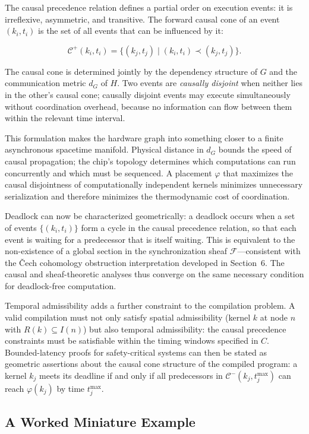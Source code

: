 \documentclass[11pt, a4paper]{article}
\begin{document}
The causal precedence relation defines a partial order on execution events: it is
irreflexive, asymmetric, and transitive. The forward causal cone of an event
$(k_i, t_i)$ is the set of all events that can be influenced by it:

\[
\mathcal{C}^+(k_i, t_i) = \{(k_j, t_j) \mid (k_i, t_i) \prec (k_j, t_j)\}.
\]

The causal cone is determined jointly by the dependency structure of $G$ and the
communication metric $d_G$ of $H$. Two events are \emph{causally disjoint} when
neither lies in the other's causal cone; causally disjoint events may execute
simultaneously without coordination overhead, because no information can flow
between them within the relevant time interval.

This formulation makes the hardware graph into something closer to a finite
asynchronous spacetime manifold. Physical distance in $d_G$ bounds the speed of
causal propagation; the chip's topology determines which computations can run
concurrently and which must be sequenced. A placement $\varphi$ that maximizes the
causal disjointness of computationally independent kernels minimizes unnecessary
serialization and therefore minimizes the thermodynamic cost of coordination.

Deadlock can now be characterized geometrically: a deadlock occurs when a set of
events $\{(k_i, t_i)\}$ form a cycle in the causal precedence relation, so that
each event is waiting for a predecessor that is itself waiting. This is equivalent
to the non-existence of a global section in the synchronization sheaf
$\mathscr{F}$---consistent with the Čech cohomology obstruction interpretation
developed in Section~6. The causal and sheaf-theoretic analyses thus
converge on the same necessary condition for deadlock-free computation.

Temporal admissibility adds a further constraint to the compilation problem.
A valid compilation must not only satisfy spatial admissibility (kernel $k$
at node $n$ with $R(k) \subseteq I(n)$) but also temporal admissibility:
the causal precedence constraints must be satisfiable within the timing windows
specified in $C$. Bounded-latency proofs for safety-critical systems can then
be stated as geometric assertions about the causal cone structure of the
compiled program: a kernel $k_j$ meets its deadline if and only if all
predecessors in $\mathcal{C}^-(k_j, t_j^{\max})$ can reach $\varphi(k_j)$
by time $t_j^{\max}$.

\subsection{A Worked Miniature Example}
\end{document}
